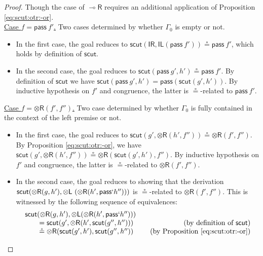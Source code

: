 \documentclass[sn-mathphys-num]{sn-jnl}%
\newcommand{\GG}{\Gamma}
\newcommand{\vd}{\vdash}
\newcommand{\tl}{\otimes \mathsf{L}}
\newcommand{\tr}{\otimes\mathsf{R}}
\newcommand{\pass}{\mathsf{pass}}
\newcommand{\unitl}{\mathsf{IL}}
\newcommand{\unitr}{\mathsf{IR}}
\newcommand{\lolli}{\multimap}
\newcommand{\lright}{{\lolli}\mathsf{R}}
\newcommand{\mf}[1]{\mathsf{#1}}
\newcommand{\scut}[2]{\mf{scut} (#1 , #2)}
\theoremstyle{thmstyleone}%
\theoremstyle{thmstyletwo}%
\theoremstyle{thmstylethree}%
\begin{document}
\begin{proof}
  Though the case of $\lright$ requires an additional application of Proposition \ref{eq:scut:otr:-or}.
  \\
  \underline{Case $f = \pass \ f'$.} Two cases determined by whether $\GG_0$ is empty or not.
  \begin{itemize}
    \item In the first case, the goal reduces to $\scut{\unitr}{\unitl (\pass \ f')} \circeq \pass \ f'$, which holds by definition of $\mf{scut}$.
    \item In the second case, the goal reduces to $\scut{\pass \ g'}{h'} \circeq \pass\ f'$. By definition of $\mf{scut}$ we have
$\scut{\pass \ g'}{h'} = \pass (\scut{g'}{h'})$. By inductive hypothesis on $f'$ and congruence, the latter is $\circeq$-related to $\pass\ f'$.
  \end{itemize} 
  \underline{Case $f = \tr (f',f'')$.} Two case determined by whether $\GG_0$ is fully contained in the context of the left premise or not.
  \begin{itemize}
    \item In the first case, the goal reduces to $\scut{g'}{\tr (h', f'')} \circeq \tr (f' , f'')$. By Proposition \ref{eq:scut:otr:-or}, we have $\scut{g'}{\tr (h', f'')} \circeq \tr (\scut{g'}{h'} , f'')$. By inductive hypothesis on $f'$ and congruence, the latter is $\circeq$-related to $\tr (f' , f'')$.
    \item In the second case, the goal reduces to showing that the derivation $\mf{scut}(\tr (g,h'),\tl\ (\tr (h',\pass` h'')))$ is $\circeq$-related to $\tr (f',f'')$.
      This is witnessed by the following sequence of equivalences:
  \[\arraycolsep=10pt    
      \begin{array}{lr}
        \mf{scut}(\tr (g,h'),\tl (\tr (h',\pass` h''))) \\
        \qquad = \mf{scut}(g',\tr (h',\mf{scut}(g'',h'')))
        & \text{(by definition of $\mf{scut}$)} \\
        \qquad \circeq \tr (\mf{scut}(g',h'),\mf{scut}(g'',h''))
        & \text{(by Proposition \ref{eq:scut:otr:-or})} \\

\end{array}\]
\end{itemize}
\end{proof}
\end{document}
